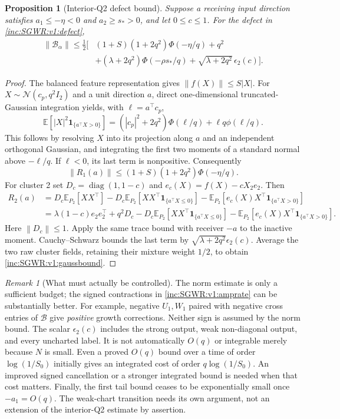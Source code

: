 \documentclass[11pt]{article}
\numberwithin{equation}{section}
\newtheorem{proposition}[theorem]{Proposition}
\theoremstyle{remark}\newtheorem{remark}[theorem]{Remark}
\newcommand{\E}{\mathbb E}
\newcommand{\norm}[1]{\left\lVert#1\right\rVert}
\newcommand{\1}{\mathbf1}
\begin{document}
\begin{proposition}[Interior-Q2 defect bound]\label{inc:SGWR:v1:gaussiandefect}
Suppose a receiving input direction satisfies $a_1\le-\eta<0$ and
$a_2\ge s_*>0$, and let $0\le c\le1$. For the defect in
\eqref{inc:SGWR:v1:defect},
\begin{align}
 \norm{\mathcal B_\alpha}\le \frac12\Big[&
 (1+S)(1+2q^2)\Phi(-\eta/q)+q^2\nonumber\\
 &+(\lambda+2q^2)\Phi(-\rho s_*/q)
 +\sqrt{\lambda+2q^2}\,\epsilon_2(c)\Big].
 \label{inc:SGWR:v1:gaussbound}
\end{align}
\end{proposition}
\begin{proof}
The balanced feature representation gives $\norm{f(X)}\le S|X|$.
For $X\sim\mathcal N(c_p,q^2I_2)$ and a unit direction $a$, direct
one-dimensional truncated-Gaussian integration yields, with $\ell=a^\top c_p$,
\[
 \E[|X|^2\1_{\{a^\top X>0\}}]
 =(|c_p|^2+2q^2)\Phi(\ell/q)+\ell q\phi(\ell/q).
\]
This follows by resolving $X$ into its projection along $a$ and an
independent orthogonal Gaussian, and integrating the first two moments
of a standard normal above $-\ell/q$. If $\ell<0$, its last term is
nonpositive. Consequently
\[
 \norm{R_1(a)}\le(1+S)(1+2q^2)\Phi(-\eta/q).
\]
For cluster 2 set $D_c=\operatorname{diag}(1,1-c)$ and
$e_c(X)=f(X)-cX_2e_2$. Then
\begin{align*}
 R_2(a)
 &=D_c\E_{P_2}[XX^\top]
   -D_c\E_{P_2}[XX^\top\1_{\{a^\top X\le0\}}]
   -\E_{P_2}[e_c(X)X^\top\1_{\{a^\top X>0\}}]\\
 &=\lambda(1-c)e_2e_2^\top+q^2D_c
   -D_c\E_{P_2}[XX^\top\1_{\{a^\top X\le0\}}]
   -\E_{P_2}[e_c(X)X^\top\1_{\{a^\top X>0\}}].
\end{align*}
Here $\norm{D_c}\le1$. Apply the same trace bound with receiver $-a$ to
the inactive moment. Cauchy--Schwarz bounds the last term by
$\sqrt{\lambda+2q^2}\epsilon_2(c)$. Average the two raw cluster fields,
retaining their mixture weight $1/2$, to obtain
\eqref{inc:SGWR:v1:gaussbound}.
\end{proof}

\begin{remark}[What must actually be controlled]
The norm estimate is only a sufficient budget; the signed contractions in
\eqref{inc:SGWR:v1:amprate} can be substantially better. For example,
negative $U_1,W_1$ paired with negative cross entries of $\mathcal B$ give
\emph{positive} growth corrections. Neither sign is assumed by the norm bound.
The scalar $\epsilon_2(c)$ includes the strong output, weak non-diagonal
output, and every uncharted label. It is not automatically $O(q)$ or
integrable merely because $N$ is small. Even a proved $O(q)$ bound over a
time of order $\log(1/S_0)$ initially gives an integrated cost of order
$q\log(1/S_0)$. An improved signed cancellation or a stronger integrated
bound is needed when that cost matters. Finally, the first tail bound ceases
to be exponentially small once $-a_1=O(q)$. The weak-chart transition needs
its own argument, not an extension of the interior-Q2 estimate by assertion.
\end{remark}
\end{document}

